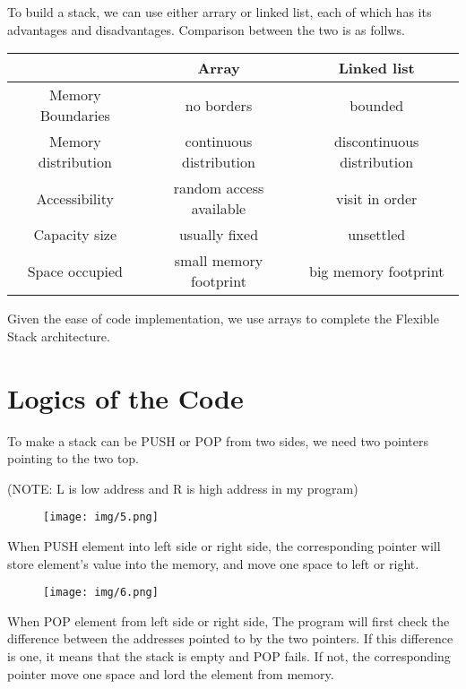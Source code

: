 \documentclass[20pt]{ctexart}
\begin{document}
To build a stack, we can use either arrary or linked list, each of which has its advantages and disadvantages. Comparison between the two is as follws.

\begin{table}[H]
  \centering
  \begin{tabular}{|c|c|c|}
    \hline
        & Array & Linked list \\
    \hline
    Memory Boundaries & no borders & bounded \\
    \hline
    Memory distribution & continuous distribution & discontinuous distribution \\
    \hline
    Accessibility & random access available & visit in order \\
    \hline
    Capacity size & usually fixed & unsettled \\
    \hline
    Space occupied & small memory footprint & big memory footprint \\
    \hline
  \end{tabular}
\end{table}

Given the ease of code implementation, we use arrays to complete the Flexible Stack architecture.

\section{Logics of the Code}
To make a stack can be PUSH or POP from two sides, we need two pointers pointing to the two top.

(NOTE: L is low address and R is high address in my program)
    \begin{figure}[H]
        \texttt{[image: img/5.png]}
      \end{figure} 

When PUSH element into left side or right side, the corresponding pointer will store element's value into the memory, and move one space to left or right.

    \begin{figure}[H]
        \texttt{[image: img/6.png]}
      \end{figure} 

When POP element from left side or right side, The program will first check the difference between the addresses pointed to by the two pointers. 
If this difference is one, it means that the stack is empty and POP fails. 
If not, the corresponding pointer move one space and lord the element from memory.
\end{document}
